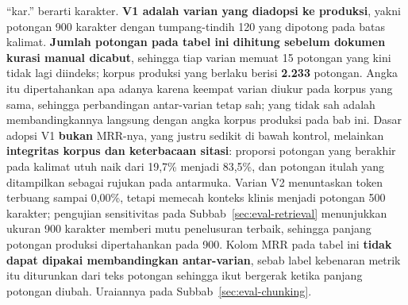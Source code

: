\begin{table}[htbp]
\vspace{0.4em}
{\tabnotestyle ``kar.'' berarti karakter. \textbf{V1 adalah varian yang diadopsi ke produksi}, yakni potongan 900 karakter dengan tumpang-tindih 120 yang dipotong pada batas kalimat. \textbf{Jumlah potongan pada tabel ini dihitung sebelum dokumen kurasi manual dicabut}, sehingga tiap varian memuat 15 potongan yang kini tidak lagi diindeks; korpus produksi yang berlaku berisi \textbf{2.233} potongan. Angka itu dipertahankan apa adanya karena keempat varian diukur pada korpus yang sama, sehingga perbandingan antar-varian tetap sah; yang tidak sah adalah membandingkannya langsung dengan angka korpus produksi pada bab ini. Dasar adopsi V1 \textbf{bukan} MRR-nya, yang justru sedikit di bawah kontrol, melainkan \textbf{integritas korpus dan keterbacaan sitasi}: proporsi potongan yang berakhir pada kalimat utuh naik dari 19,7\% menjadi 83,5\%, dan potongan itulah yang ditampilkan sebagai rujukan pada antarmuka. Varian V2 menuntaskan token terbuang sampai 0,00\%, tetapi memecah konteks klinis menjadi potongan 500 karakter; pengujian sensitivitas pada Subbab~\ref{sec:eval-retrieval} menunjukkan ukuran 900 karakter memberi mutu penelusuran terbaik, sehingga panjang potongan produksi dipertahankan pada 900. Kolom MRR pada tabel ini \textbf{tidak dapat dipakai membandingkan antar-varian}, sebab label kebenaran metrik itu diturunkan dari teks potongan sehingga ikut bergerak ketika panjang potongan diubah. Uraiannya pada Subbab~\ref{sec:eval-chunking}.\par}
\end{table}
